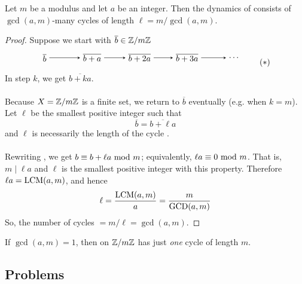 \begin{proposition}
Let $m$ be a modulus and let $a$ be an integer. Then the dynamics of  consists of $\gcd(a,m)$-many cycles of length $\ell = m/\gcd(a,m)$.
\end{proposition}
\begin{proof}
Suppose we start with $\overline{b} \in \mathbb Z/m\mathbb Z$
\[\begin{tikzpicture}[->,>=stealth,auto,node distance=2cm,main node/.style={rectangle,draw}]

  \node[] (1) {$\overline{b}$};
  \node[] (2) [right of=1] {$\overline{b+a}$};
  \node[] (3) [right of=2] {$\overline{b+2a}$};
  \node[] (4) [right of=3] {$\overline{b+3a}$};
  \node[] (5) [right of=4] {$\cdots$};

  \path[every node/.style={font=\sffamily\small}]
    (1) edge[] node[] {} (2)
    (2) edge[] node[] {} (3)
    (3) edge[] node[] {} (4)
    (4) edge[] node[] {} (5);
\end{tikzpicture}\label{cycle1}\tag{$\ast$}\]
In step $k$, we get $\overline{b + ka}$.\\
\\
Because $X = \mathbb Z/m\mathbb Z$ is a finite set, we return to $\overline{b}$ eventually (e.g. when $k = m$). Let $\ell$ be the smallest positive integer such that
\[\overline{b} = \overline{b + \ell a}\label{cycle2}\tag{$\ast\ast$}\]
and $\ell$ is necessarily the length of the cycle .\\
\\
Rewriting , we get $b \equiv b + \ell a\text{ mod }{m}$; equivalently, $\ell a \equiv 0 \text{ mod }{m}$. That is, $m\mid \ell a$ and $\ell$ is the smallest positive integer with this property. Therefore $\ell a = \operatorname{LCM}(a,m)$, and hence
\[\ell = \frac{\operatorname{LCM}(a,m)}{a} = \frac{m}{\operatorname{GCD}(a,m)}\]
So, the number of cycles $= m/\ell = \gcd(a,m)$.
\end{proof}

\vspace*{1.5em}

\begin{corollary}
If $\gcd(a,m) = 1$, then  on $\mathbb Z/m\mathbb Z$ has just \emph{one} cycle of length $m$.
\end{corollary}

\vspace*{0.5in}

\subsection{Problems}
\vspace{0.1in}

